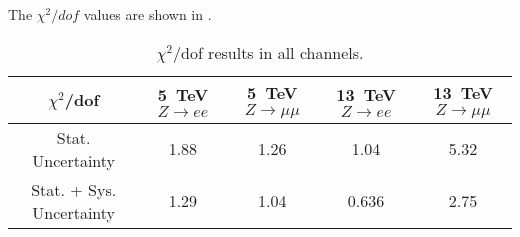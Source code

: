 The $\chi^2/dof$ values are shown in \Tab{\ref{tab:chi2OverDOF}}.

\begin{table}[h]
\centering
\begin{tabular}{|c|c|c|c|c|}
\hline
$\chi^2$/dof & 5~TeV $Z\rightarrow ee$ & 5~TeV $Z\rightarrow \mu\mu$ & 13~TeV $Z\rightarrow ee$ & 13~TeV $Z\rightarrow \mu\mu$\\
\hline
Stat. Uncertainty & 1.88 & 1.26 & 1.04 & 5.32 \\
\hline
Stat. + Sys. Uncertainty & 1.29 & 1.04 & 0.636 & 2.75 \\
\hline
\end{tabular}
\caption{$\chi^2/$dof results in all channels.}
\label{tab:chi2OverDOF}
\end{table}
